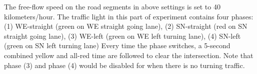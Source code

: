 
The free-flow speed on the road segments in above settings is set to 40 kilometers/hour. The traffic light in this part of experiment contains four phases: (1) WE-straight (green on WE straight going lane), (2) SN-straight (red on SN straight going lane), (3) WE-left (green on WE left turning lane), (4) SN-left (green on SN left turning lane) Every time the phase switches, a 5-second combined yellow and all-red time are followed to clear the intersection. Note that phase (3) and phase (4) would be disabled for when there is no turning traffic.
 
